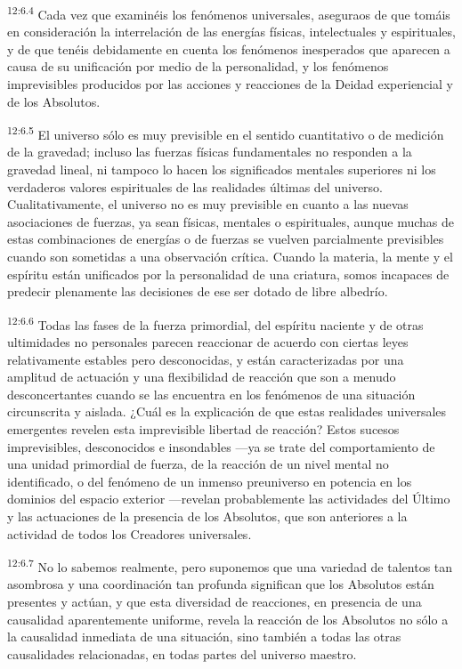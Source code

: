 \par
\textsuperscript{12:6.4} Cada vez que examinéis los fenómenos universales, aseguraos de que tomáis en consideración la interrelación de las energías físicas, intelectuales y espirituales, y de que tenéis debidamente en cuenta los fenómenos inesperados que aparecen a causa de su unificación por medio de la personalidad, y los fenómenos imprevisibles producidos por las acciones y reacciones de la Deidad experiencial y de los Absolutos.

\par
\textsuperscript{12:6.5} El universo sólo es muy previsible en el sentido cuantitativo o de medición de la gravedad; incluso las fuerzas físicas fundamentales no responden a la gravedad lineal, ni tampoco lo hacen los significados mentales superiores ni los verdaderos valores espirituales de las realidades últimas del universo. Cualitativamente, el universo no es muy previsible en cuanto a las nuevas asociaciones de fuerzas, ya sean físicas, mentales o espirituales, aunque muchas de estas combinaciones de energías o de fuerzas se vuelven parcialmente previsibles cuando son sometidas a una observación crítica. Cuando la materia, la mente y el espíritu están unificados por la personalidad de una criatura, somos incapaces de predecir plenamente las decisiones de ese ser dotado de libre albedrío.

\par
\textsuperscript{12:6.6} Todas las fases de la fuerza primordial, del espíritu naciente y de otras ultimidades no personales parecen reaccionar de acuerdo con ciertas leyes relativamente estables pero desconocidas, y están caracterizadas por una amplitud de actuación y una flexibilidad de reacción que son a menudo desconcertantes cuando se las encuentra en los fenómenos de una situación circunscrita y aislada. ¿Cuál es la explicación de que estas realidades universales emergentes revelen esta imprevisible libertad de reacción? Estos sucesos imprevisibles, desconocidos e insondables ---ya se trate del comportamiento de una unidad primordial de fuerza, de la reacción de un nivel mental no identificado, o del fenómeno de un inmenso preuniverso en potencia en los dominios del espacio exterior ---revelan probablemente las actividades del Último y las actuaciones de la presencia de los Absolutos, que son anteriores a la actividad de todos los Creadores universales.

\par
\textsuperscript{12:6.7} No lo sabemos realmente, pero suponemos que una variedad de talentos tan asombrosa y una coordinación tan profunda significan que los Absolutos están presentes y actúan, y que esta diversidad de reacciones, en presencia de una causalidad aparentemente uniforme, revela la reacción de los Absolutos no sólo a la causalidad inmediata de una situación, sino también a todas las otras causalidades relacionadas, en todas partes del universo maestro.

